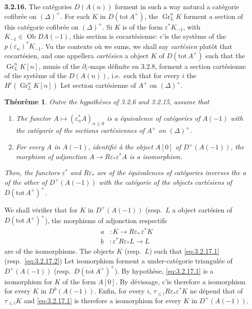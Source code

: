\documentclass[12pt,a4paper]{article}
\theoremstyle{plain}
\newtheorem{theorem}{Th\'{e}or\`{e}me}[section]
\theoremstyle{definition}
\DeclareMathOperator{\Gr}{Gr}
\DeclareMathOperator{\Ob}{Ob}
\begin{document}
\noindent\textbf{3.2.16.} The cat\'{e}gories $D(A(n))$ forment in such a way natural a cat\'{e}gorie cofibr\'{e}e on $(\Delta)^{+}$. For each $K$ in $D(\mathrm{tot}\, A^{+})$, the $\Gr^{n}_{L}K$ forment a section of this cat\'{e}gorie cofibr\'{e}e on $(\Delta)^{+}$. Si $K$ is of the form $\varepsilon^{*}K_{-1}$, with $K_{-1} \in \Ob DA(-1)$, this section is cocart\'{e}sienne: c'is the syst\`{e}me of the $p(\varepsilon_{n})^{*}K_{-1}$. Vu the contexte o\`{u} we sums, we shall say \emph{cart\'{e}sien} plut\^{o}t that cocart\'{e}sien, and one appellera \emph{cart\'{e}sien} a object $K$ of $D(\mathrm{tot}\, A^{+})$ such that the $\Gr^{n}_{L}K[n]$, munis of the $\partial_{i}$-maps d\'{e}finite en 3.2.8, forment a section cart\'{e}sienne of the syst\`{e}me of the $D(A(n))$, i.e.\ such that for every $i$ the $H^{i}(\Gr^{n}_{L}K[n])$ Let section cart\'{e}sienne of $A^{+}$ on $(\Delta)^{+}$.

\begin{theorem}\label{thm:3.2.17}
Outre the hypoth\`{e}ses of \emph{3.2.6} and \emph{3.2.15}, assume that
\begin{enumerate}
\item[(a)] The functor $A \longmapsto (\varepsilon_{n}^{*}A)_{n \geq 0}$ is a \'{e}quivalence of cat\'{e}gories of $A(-1)$ with the cat\'{e}gorie of the sections cart\'{e}siennes of $A^{+}$ on $(\Delta)^{+}$.
\item[(b)] For every $A$ in $A(-1)$, identifi\'{e} \`{a} the object $A[0]$ of $D^{+}(A(-1))$, the morphism of adjonction $A \longrightarrow R\varepsilon_{*}\varepsilon^{*}A$ is a isomorphism.
\end{enumerate}
Then, the functors $\varepsilon^{*}$ and $R\varepsilon_{*}$ are of the \'{e}quivalences of cat\'{e}gories inverses the a of the other of $D^{+}(A(-1))$ with the cat\'{e}gorie of the objects cart\'{e}siens of $D(\mathrm{tot}\, A^{+})^{+}$.
\end{theorem}

We shall v\'{e}rifier that for $K$ in $D^{+}(A(-1))$ (resp.\ $L$ a object cart\'{e}sien of $D(\mathrm{tot}\, A^{+})^{+}$), the morphisms of adjonction respectifs
\begin{align}
\label{eq:3.2.17.1} a &: K \longrightarrow R\varepsilon_{*}\,\varepsilon^{*}K \\
\label{eq:3.2.17.2} \underline{b} &: \varepsilon^{*}R\varepsilon_{*}L \longrightarrow L
\end{align}
are of the isomorphisms. The objects $K$ (resp.\ $L$) such that \eqref{eq:3.2.17.1} (resp.\ \eqref{eq:3.2.17.2}) Let isomorphism forment a under-cat\'{e}gorie triangul\'{e}e of $D^{+}(A(-1))$ (resp.\ $D(\mathrm{tot}\, A^{+})^{+}$). By hypoth\`{e}se, \eqref{eq:3.2.17.1} is a isomorphism for $K$ of the form $A[0]$. By d\'{e}vissage, c'is therefore a isomorphism for every $K$ in $D^{b}(A(-1))$. Enfin, for every $i$, $\tau_{\leq i}R\varepsilon_{*}\varepsilon^{*}K$ ne d\'{e}pend that of $\tau_{\leq i}K$ and \eqref{eq:3.2.17.1} is therefore a isomorphism for every $K$ in $D^{+}(A(-1))$.
\end{document}
